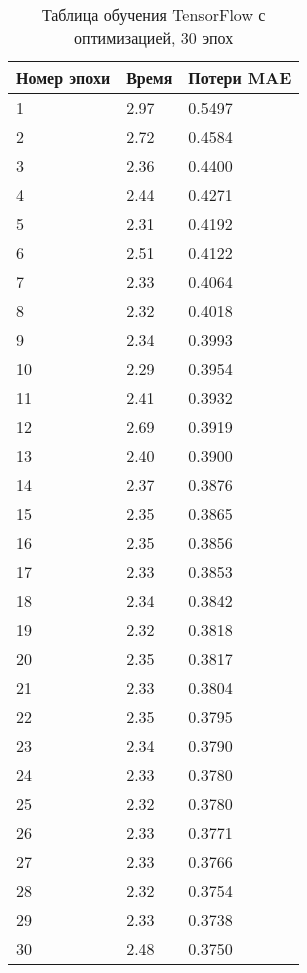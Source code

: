 \documentclass[a4paper,12pt,titlepage,final]{article}
\begin{document}
\begin{table}[H]
\centering
\begin{tabular}{|p{6.4cm}|p{3.2cm}|p{3.2cm}|}
\hline
Номер эпохи & Время & Потери MAE \\
\hline
1 & 2.97 & 0.5497 \\ [1.5ex]
\hline
2 & 2.72 & 0.4584 \\ [1.5ex]
\hline
3 & 2.36 & 0.4400 \\ [1.5ex]
\hline
4 & 2.44 & 0.4271 \\ [1.5ex]
\hline
5 & 2.31 & 0.4192 \\ [1.5ex]
\hline
6 & 2.51 & 0.4122 \\ [1.5ex]
\hline
7 & 2.33 & 0.4064 \\ [1.5ex]
\hline
8 & 2.32 & 0.4018 \\ [1.5ex]
\hline
9 & 2.34 & 0.3993 \\ [1.5ex]
\hline
10 & 2.29 & 0.3954 \\ [1.5ex]
\hline
11 & 2.41 & 0.3932 \\ [1.5ex]
\hline
12 & 2.69 & 0.3919 \\ [1.5ex]
\hline
13 & 2.40 & 0.3900 \\ [1.5ex]
\hline
14 & 2.37 & 0.3876 \\ [1.5ex]
\hline
15 & 2.35 & 0.3865 \\ [1.5ex]
\hline
16 & 2.35 & 0.3856 \\ [1.5ex]
\hline
17 & 2.33 & 0.3853 \\ [1.5ex]
\hline
18 & 2.34 & 0.3842 \\ [1.5ex]
\hline
19 & 2.32 & 0.3818 \\ [1.5ex]
\hline
20 & 2.35 & 0.3817 \\ [1.5ex]
\hline
21 & 2.33 & 0.3804 \\ [1.5ex]
\hline
22 & 2.35 & 0.3795 \\ [1.5ex]
\hline
23 & 2.34 & 0.3790 \\ [1.5ex]
\hline
24 & 2.33 & 0.3780 \\ [1.5ex]
\hline
25 & 2.32 & 0.3780 \\ [1.5ex]
\hline
26 & 2.33 & 0.3771 \\ [1.5ex]
\hline
27 & 2.33 & 0.3766 \\ [1.5ex]
\hline
28 & 2.32 & 0.3754 \\ [1.5ex]
\hline
29 & 2.33 & 0.3738 \\ [1.5ex]
\hline
30 & 2.48 & 0.3750 \\ [1.5ex]
\hline
\end{tabular}
\caption{Таблица обучения TensorFlow с оптимизацией, 30 эпох}
\label{table6}
\end{table}
\end{document}
